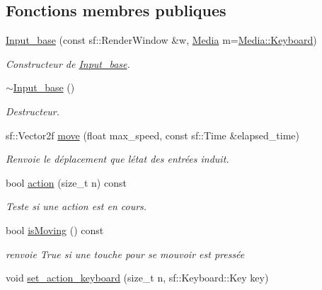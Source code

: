 \subsection*{Fonctions membres publiques}
\begin{DoxyCompactItemize}
\item 
\hyperlink{class_input__base_a4e1efd96da3e870a9b2f6613b99e6c00}{Input\+\_\+base} (const sf\+::\+Render\+Window \&w, \hyperlink{class_input__base_a455585e7933485981b3d7bfcad3a47c6}{Media} m=\hyperlink{class_input__base_a455585e7933485981b3d7bfcad3a47c6a6ce4d85a628a88bbdb3ac24a8e5a9c2e}{Media\+::\+Keyboard})
\begin{DoxyCompactList}\small\item\em Constructeur de \hyperlink{class_input__base}{Input\+\_\+base}. \end{DoxyCompactList}\item 
\hyperlink{class_input__base_a7dabafa58d0e4bd94a84562900d06a5e}{$\sim$\+Input\+\_\+base} ()
\begin{DoxyCompactList}\small\item\em Destructeur. \end{DoxyCompactList}\item 
sf\+::\+Vector2f \hyperlink{class_input__base_a61bba67b702dfd77db2091409ab1d20b}{move} (float max\+\_\+speed, const sf\+::\+Time \&elapsed\+\_\+time)
\begin{DoxyCompactList}\small\item\em Renvoie le déplacement que l\textquotesingle{}état des entrées induit. \end{DoxyCompactList}\item 
bool \hyperlink{class_input__base_a2ac741377832fd670954dba5abf82a10}{action} (size\+\_\+t n) const
\begin{DoxyCompactList}\small\item\em Teste si une action est en cours. \end{DoxyCompactList}\item 
bool \hyperlink{class_input__base_a895ecc7012d6ccdd4284de7d613f2ed2}{is\+Moving} () const
\begin{DoxyCompactList}\small\item\em renvoie True si une touche pour se mouvoir est pressée \end{DoxyCompactList}\item 
void \hyperlink{class_input__base_aba7163e5edb9d3f938811d990863ce0e}{set\+\_\+action\+\_\+keyboard} (size\+\_\+t n, sf\+::\+Keyboard\+::\+Key key)
\item 

\end{DoxyCompactItemize}
